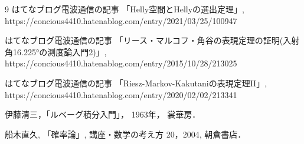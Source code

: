 \documentclass[leqno, a4paper, 12pt]{jsarticle}
\begin{document}
	
\begin{thebibliography}{9}
はてなブログ電波通信の記事
「Helly空間とHellyの選出定理」,
https://concious4410.hatenablog.com/entry/2021/03/25/100947


はてなブログ電波通信の記事
「リース・マルコフ・角谷の表現定理の証明(入射角16.225°の測度論入門2)」, 
https://concious4410.hatenablog.com/entry/2015/10/28/213025

はてなブログ電波通信の記事
「Riesz-Markov-Kakutaniの表現定理II」, 
https://concious4410.hatenablog.com/entry/2020/02/02/213341


伊藤清三，「ルベーグ積分入門」，
1963年，
裳華房．

船木直久, 「確率論」, 
講座・数学の考え方 20，2004, 朝倉書店．
\end{thebibliography}




			
\end{document}
